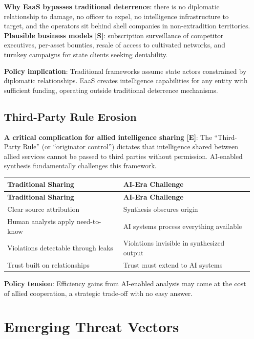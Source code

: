 \documentclass[11pt,letterpaper]{article}
\newcommand{\etraneed}[1]{\par\ifdim\pagegoal<\maxdimen\ifdim\pagetotal<\pagegoal\ifdim\dimexpr\pagegoal-\pagetotal\relax<\dimexpr#1\relax\newpage\fi\fi\fi}
\begin{document}
\textbf{Why EaaS bypasses traditional deterrence}: there is no diplomatic relationship to damage, no officer to expel, no intelligence infrastructure to target, and the operators sit behind shell companies in non-extradition territories. \textbf{Plausible business models} \textbf{[S]}: subscription surveillance of competitor executives, per-asset bounties, resale of access to cultivated networks, and turnkey campaigns for state clients seeking deniability.

\textbf{Policy implication}: Traditional frameworks assume state actors constrained by diplomatic relationships. EaaS creates intelligence capabilities for any entity with sufficient funding, operating outside traditional deterrence mechanisms.

\subsection{Third-Party Rule Erosion}

\textbf{A critical complication for allied intelligence sharing} \textbf{[E]}: The ``Third-Party Rule'' (or ``originator control'') dictates that intelligence shared between allied services cannot be passed to third parties without permission. AI-enabled synthesis fundamentally challenges this framework.

\etraneed{10\baselineskip}
{\small
\begin{longtable}{L{4cm}L{8cm}}
\toprule
\textbf{Traditional Sharing} & \textbf{AI-Era Challenge} \\
\midrule
\endfirsthead
\toprule
\textbf{Traditional Sharing} & \textbf{AI-Era Challenge} \\
\midrule
\endhead
Clear source attribution & Synthesis obscures origin \\*
Human analysts apply need-to-know & AI systems process everything available \\
Violations detectable through leaks & Violations invisible in synthesized output \\*
Trust built on relationships & Trust must extend to AI systems \\
\bottomrule
\end{longtable}}

\textbf{Policy tension}: Efficiency gains from AI-enabled analysis may come at the cost of allied cooperation, a strategic trade-off with no easy answer.

\section{Emerging Threat Vectors}\label{sec:vectors}
\end{document}

